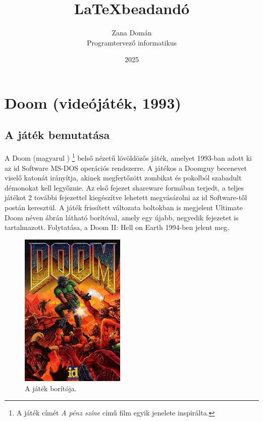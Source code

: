 \documentclass{thesis-ekf}
\theoremstyle{definition}
\theoremstyle{remark}
\begin{document}
\title{\LaTeX beadandó}
\author{Zana Domán\\Programtervező informatikus}
\date{2025}
\maketitle

\tableofcontents

\chapter{Doom (videójáték, 1993)}

\section{A játék bemutatása}

A Doom (magyarul ) \footnote{A játék címét \textit{A pénz színe}
című film egyik jenelete inspirálta.} belső nézetű lövöldözős játék, amelyet
1993-ban adott ki az id Software MS-DOS operációs rendszerre. A játékos a
Doomguy becenevet viselő katonát irányítja, akinek megfertőzött zombikat és
pokolból szabadult démonokat kell legyőznie. Az első fejezet shareware formában
terjedt, a teljes játékot 2 további fejezettel kiegészítve lehetett megvásárolni
az id Software-től postán keresztül. A játék frissített változata boltokban is
megjelent Ultimate Doom néven  ábrán látható borítóval, amely
egy újabb, negyedik fejezetet is tartalmazott. Folytatása, a Doom II: Hell on
Earth 1994-ben jelent meg.

\begin{figure}[h]
    \centering
    \includegraphics[width=5cm]{doom.jpg}
    \caption{A játék borítója.}
    \label{fig:borito}
\end{figure}
\end{document}
